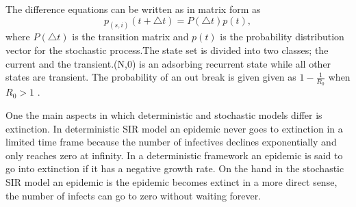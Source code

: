 The difference equations can be written as in matrix form as 
\begin{equation*}
p_{(s,i)}(t + \bigtriangleup t) = P (\bigtriangleup t)p(t),
\end{equation*}
where $P(\bigtriangleup t)$ is the transition matrix and $p(t)$ is the probability distribution vector for the stochastic process.The state set is divided into two classes; the current and the transient.(N,0) is an adsorbing recurrent state while all other states are transient. The probability of an out break is given given as $1- \frac{1}{R_0}$ when $R_0 >1$ \citep{Brauer2017}.

One the main aspects in which deterministic and stochastic models differ is extinction. In deterministic SIR model an epidemic never goes to extinction in a limited time frame  because the number of infectives declines exponentially and only reaches zero at infinity.  In a deterministic framework an epidemic is said to go into extinction if it has a negative growth rate. On the hand in the stochastic SIR model an epidemic is the  epidemic becomes extinct in a more direct sense, the number of infects can go to zero without waiting forever.